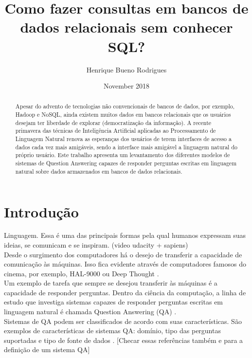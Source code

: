 \documentclass{article}
\title{Como fazer consultas em bancos de dados relacionais sem conhecer SQL?}
\author{Henrique Bueno Rodrigues}
\date{November 2018}
\begin{document}
\maketitle
\begin{abstract}
Apesar do advento de tecnologias não convencionais de bancos de dados, por exemplo, Hadoop e NoSQL, ainda existem muitos dados em bancos relacionais que os usuários desejam ter liberdade de explorar (democratização da informação). A recente primavera das técnicas de Inteligência Artificial aplicadas ao Processamento de Linguagem Natural renova as esperanças dos usuários de terem interfaces de acesso a dados cada vez mais amigáveis, sendo a interface mais amigável a linguagem natural do próprio usuário. Este trabalho apresenta um levantamento dos diferentes modelos de sistemas de Question Answering capazes de responder perguntas escritas em linguagem natural sobre dados armazenados em bancos de dados relacionais.

\end{abstract}
%
\section{Introdução}

Linguagem. Essa é uma das principais formas pela qual humanos expressam suas ideias, se comunicam e se inspiram. (video udacity + sapiens)\\

Desde o surgimento dos computadores há o desejo de transferir a capacidade de comunicação às máquinas. Isso fica evidente através de computadores famosos do cinema, por exemplo, HAL-9000 \citep{hal9000} ou Deep Thought \citep{deepThought}.\\

Um exemplo de tarefa que sempre se desejou transferir às máquinas é a capacidade de responder perguntas. Dentro da ciência da computação, a linha de estudo que investiga sistemas capazes de responder perguntas escritas em linguagem natural é chamada Question Answering (QA) \citep{questionAnswering}.\\

Sistemas de QA podem ser classificados de acordo com suas características. São exemplos de características de sistemas QA: domínio, tipo das perguntas suportadas e tipo de fonte de dados \citep{mishra2016survey, speech}. [Checar essas referências também \citep{lopez2011question} e \citep{hirschman2001natural} para a definição de um sistema QA]\\
\end{document}
